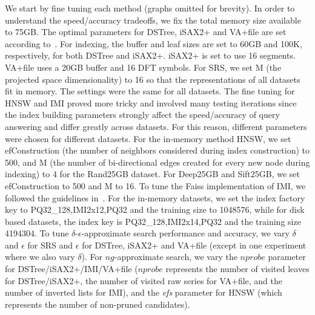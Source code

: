 {{\color{black}
We start by fine tuning each method (graphs omitted for brevity). 
In order to understand the speed/accuracy tradeoffs, we fix the total memory size available to 75GB. 
The optimal parameters for DSTree, iSAX2+ and VA+file are set according to~\cite{journal/pvldb/echihabi2018}. 
For indexing, the buffer and leaf sizes are set to 60GB and 100K, respectively, for both DSTree and iSAX2+. 
iSAX2+ is set to use 16 segments. 
VA+file uses a 20GB buffer and 16 DFT symbols. 
For SRS, we set M (the projected space dimensionality) to 16 so that the representations of all datasets fit in memory. 
The settings were the same for all datasets. 
The fine tuning for HNSW and IMI proved more tricky and involved many testing iterations since the index building parameters strongly affect the speed/accuracy of query answering and differ greatly across datasets. 
For this reason, different parameters were chosen for different datasets. 
For the in-memory method HNSW, we set efConstruction (the number of neighbors considered during index construction) to 500, and M (the number of bi-directional edges created for every new node during indexing) to 4 for the Rand25GB dataset. 
{\color{black} For Deep25GB and Sift25GB, we set efConstruction to 500 and M to 16}.
To tune the Faiss implementation of IMI, we followed the guidelines in~\cite{url/faiss}. 
For the in-memory datasets, we set the index factory key to PQ32\_128,IMI2x12,PQ32 and the training size to 1048576, while for disk based datasets, the index key is PQ32\_128,IMI2x14,PQ32 and the training size 4194304. 
To tune $\delta$-$\epsilon$-approximate search performance and accuracy, we vary $\delta$ and $\epsilon$ for SRS and $\epsilon$ for DSTree, iSAX2+ and VA+file (except in one experiment where we also vary $\delta$). 
For $ng$-approximate search, we vary the $nprobe$ parameter for DSTree/iSAX2+/IMI/VA+file ($nprobe$ represents the number of visited leaves for DSTree/iSAX2+, the number of visited raw series for VA+file, and the number of inverted lists for IMI), and the \emph{efs} parameter for HNSW (which represents the number of non-pruned candidates). %


}}
